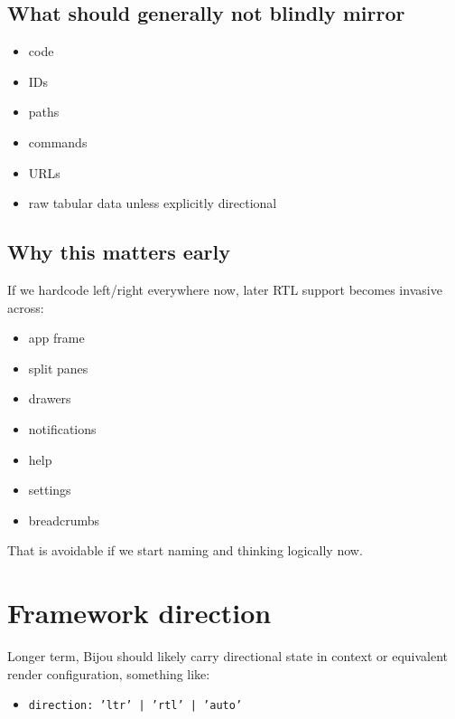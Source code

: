 \subsection{What should generally not blindly mirror}\label{record-051-what-should-generally-not-blindly-mirror}

\begin{itemize}
\tightlist
\item
  code
\item
  IDs
\item
  paths
\item
  commands
\item
  URLs
\item
  raw tabular data unless explicitly directional
\end{itemize}

\subsection{Why this matters early}\label{record-051-why-this-matters-early}

If we hardcode left/right everywhere now, later RTL support becomes invasive across:

\begin{itemize}
\tightlist
\item
  app frame
\item
  split panes
\item
  drawers
\item
  notifications
\item
  help
\item
  settings
\item
  breadcrumbs
\end{itemize}

That is avoidable if we start naming and thinking logically now.

\section{Framework direction}\label{record-051-framework-direction}

Longer term, Bijou should likely carry directional state in context or equivalent render configuration, something like:

\begin{itemize}
\tightlist
\item
  \texttt{d\allowbreak{}i\allowbreak{}r\allowbreak{}e\allowbreak{}c\allowbreak{}t\allowbreak{}i\allowbreak{}o\allowbreak{}n\allowbreak{}:\allowbreak{} \allowbreak{}'\allowbreak{}l\allowbreak{}t\allowbreak{}r\allowbreak{}'\allowbreak{} \allowbreak{}|\allowbreak{} \allowbreak{}'\allowbreak{}r\allowbreak{}t\allowbreak{}l\allowbreak{}'\allowbreak{} \allowbreak{}|\allowbreak{} \allowbreak{}'\allowbreak{}a\allowbreak{}u\allowbreak{}t\allowbreak{}o\allowbreak{}'}
\end{itemize}


